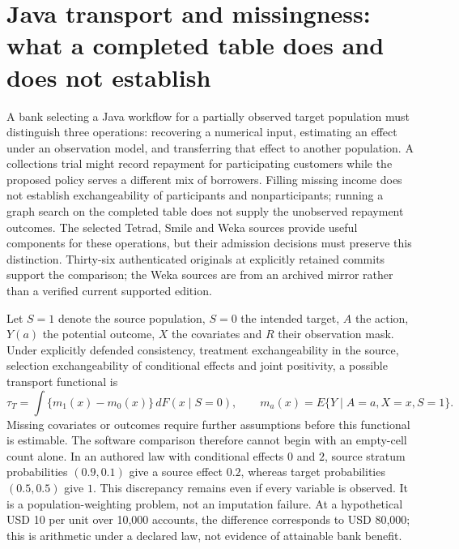 \section[Java transport and missingness contracts]{Java transport and missingness: what a completed table does and does not establish}
\label{sec:exec25-jtm}

A bank selecting a Java workflow for a partially observed target population must distinguish three operations: recovering a numerical input, estimating an effect under an observation model, and transferring that effect to another population. A collections trial might record repayment for participating customers while the proposed policy serves a different mix of borrowers. Filling missing income does not establish exchangeability of participants and nonparticipants; running a graph search on the completed table does not supply the unobserved repayment outcomes. The selected Tetrad, Smile and Weka sources provide useful components for these operations, but their admission decisions must preserve this distinction. Thirty-six authenticated originals at explicitly retained commits support the comparison; the Weka sources are from an archived mirror rather than a verified current supported edition.~\citep{exec25_jtm_tetrad,exec25_jtm_smile,exec25_jtm_weka}

Let $S=1$ denote the source population, $S=0$ the intended target, $A$ the action, $Y(a)$ the potential outcome, $X$ the covariates and $R$ their observation mask. Under explicitly defended consistency, treatment exchangeability in the source, selection exchangeability of conditional effects and joint positivity, a possible transport functional is
\[
 \tau_T=\int\{m_1(x)-m_0(x)\}\,dF(x\mid S=0),
 \qquad m_a(x)=E\{Y\mid A=a,X=x,S=1\}.
\]
Missing covariates or outcomes require further assumptions before this functional is estimable. The software comparison therefore cannot begin with an empty-cell count alone. In an authored law with conditional effects $0$ and $2$, source stratum probabilities $(0.9,0.1)$ give a source effect $0.2$, whereas target probabilities $(0.5,0.5)$ give $1$. This discrepancy remains even if every variable is observed. It is a population-weighting problem, not an imputation failure. At a hypothetical USD 10 per unit over 10,000 accounts, the difference corresponds to USD 80,000; this is arithmetic under a declared law, not evidence of attainable bank benefit.~\citep{exec25_jtm_choice}

